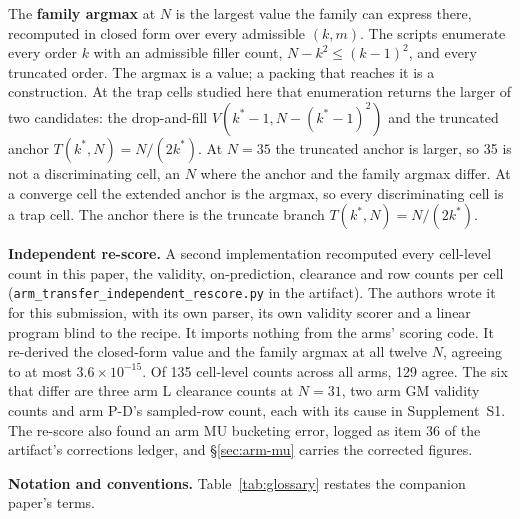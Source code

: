 The \textbf{family argmax} at $N$ is the largest value the family can express there,
recomputed in closed form over every admissible $(k, m)$. The scripts enumerate every order
$k$ with an admissible filler count, $N - k^2 \le (k-1)^2$, and every truncated order. The
argmax is a value; a packing
that reaches it is a construction. At the trap cells studied here that enumeration returns
the larger
of two candidates: the drop-and-fill $V(k^*{-}1, N - (k^*{-}1)^2)$ and the truncated anchor
$T(k^*, N) = N/(2k^*)$. At $N = 35$ the truncated anchor is larger, so 35 is not a
discriminating cell, an $N$ where the anchor and the family argmax differ. At a converge cell the extended anchor is the argmax, so every
discriminating cell is a trap cell. The anchor there is the truncate
branch $T(k^*, N) = N/(2k^*)$.

\textbf{Independent re-score.} A second implementation recomputed every cell-level count in
this paper, the validity, on-prediction, clearance and row counts per cell
(\texttt{arm\_transfer\_\bk{}independent\_\bk{}rescore.py} in the artifact). The authors wrote
it for this submission, with its own parser, its own validity scorer and a linear program
blind to the recipe. It imports nothing from the arms' scoring code. It re-derived the
closed-form value and the family argmax at all twelve $N$, agreeing to at most
$3.6 \times 10^{-15}$. Of 135 cell-level counts across all arms, 129 agree. The six that
differ are three arm L clearance counts at $N = 31$, two arm GM validity counts and arm P-D's
sampled-row count, each with its cause in Supplement~S1. The re-score also found an arm MU
bucketing error, logged as item 36 of the artifact's corrections ledger, and
\S\ref{sec:arm-mu} carries the corrected figures.

\textbf{Notation and conventions.} Table~\ref{tab:glossary} restates the companion paper's
terms.

